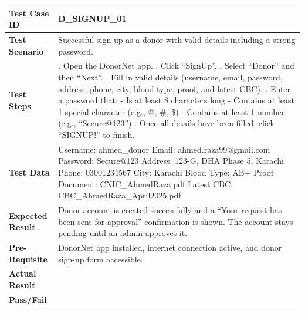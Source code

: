 \documentclass[11pt]{article}
\begin{document}
\noindent
\begin{tabularx}{\textwidth}{|>{\raggedright\arraybackslash}p{}|>{\raggedright\arraybackslash}X|}
\hline
\textbf{Test Case ID} & D\_SIGNUP\_01 \\
\hline
\textbf{Test Scenario} & Successful sign-up as a donor with valid details including a strong password. \\
\hline
\textbf{Test Steps} & 1. Open the DonorNet app. \newline
2. Click ``SignUp''. \newline
3. Select ``Donor'' and then ``Next''. \newline
4. Fill in valid details (username, email, password, address, phone, city, blood type, proof, and latest CBC). \newline
5. Enter a password that: \newline
\hspace*{1em}- Is at least 8 characters long \newline
\hspace*{1em}- Contains at least 1 special character (e.g., @, \#, \$) \newline
\hspace*{1em}- Contains at least 1 number (e.g., ``Secure@123'') \newline
6. Once all details have been filled, click ``SIGNUP!'' to finish. \\
\hline
\textbf{Test Data} & Username: ahmed\_donor \newline
Email: ahmed.raza99@gmail.com \newline
Password: Secure@123 \newline
Address: 123-G, DHA Phase 5, Karachi \newline
Phone: 03001234567 \newline
City: Karachi \newline
Blood Type: AB+ \newline
Proof Document: CNIC\_AhmedRaza.pdf \newline
Latest CBC: CBC\_AhmedRaza\_April2025.pdf \\
\hline
\textbf{Expected Result} & Donor account is created successfully and a ``Your request has been sent for approval'' confirmation is shown. The account stays pending until an admin approves it. \\
\hline
\textbf{Pre-Requisite} & DonorNet app installed, internet connection active, and donor sign-up form accessible. \\
\hline
\textbf{Actual Result} &  \\
\hline
\textbf{Pass/Fail} &  \\
\hline
\end{tabularx}
\vspace{1em}
\end{document}
